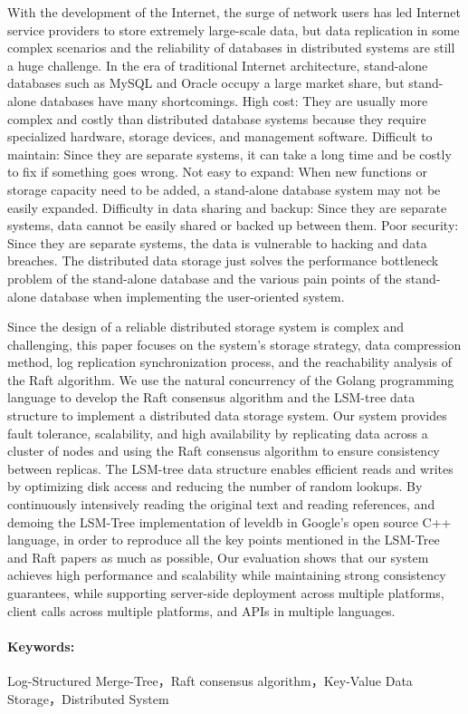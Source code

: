 With the development of the Internet, the surge of network users has led Internet service providers to store extremely large-scale data, but data replication in some complex scenarios and the reliability of databases in distributed systems are still a huge challenge.
In the era of traditional Internet architecture, stand-alone databases such as MySQL and Oracle occupy a large market share, but stand-alone databases have many shortcomings.
High cost: They are usually more complex and costly than distributed database systems because they require specialized hardware, storage devices, and management software.
Difficult to maintain: Since they are separate systems, it can take a long time and be costly to fix if something goes wrong.
Not easy to expand: When new functions or storage capacity need to be added, a stand-alone database system may not be easily expanded.
Difficulty in data sharing and backup: Since they are separate systems, data cannot be easily shared or backed up between them.
Poor security: Since they are separate systems, the data is vulnerable to hacking and data breaches.
The distributed data storage just solves the performance bottleneck problem of the stand-alone database and the various pain points of the stand-alone database when implementing the user-oriented system.


Since the design of a reliable distributed storage system is complex and challenging, this paper focuses on the system's storage strategy, data compression method, log replication synchronization process, and the reachability analysis of the Raft algorithm.
We use the natural concurrency of the Golang programming language to develop the Raft consensus algorithm and the LSM-tree data structure to implement a distributed data storage system.
Our system provides fault tolerance, scalability, and high availability by replicating data across a cluster of nodes and using the Raft consensus algorithm to ensure consistency between replicas. The LSM-tree data structure enables efficient reads and writes by optimizing disk access and reducing the number of random lookups.
By continuously intensively reading the original text and reading references, and demoing the LSM-Tree implementation of leveldb in Google's open source C++ language, in order to reproduce all the key points mentioned in the LSM-Tree and Raft papers as much as possible,
Our evaluation shows that our system achieves high performance and scalability while maintaining strong consistency guarantees, while supporting server-side deployment across multiple platforms, client calls across multiple platforms, and APIs in multiple languages.

\paragraph{Keywords: }Log-Structured Merge-Tree，Raft consensus algorithm，Key-Value Data Storage，Distributed System






